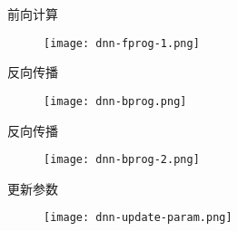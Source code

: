 \begin{frame}[fragile]{前向计算}
  \begin{figure}
    \centering
    \texttt{[image: dnn-fprog-1.png]}
  \end{figure}
\end{frame}

\begin{frame}[fragile]{反向传播}
  \begin{figure}
    \centering
    \texttt{[image: dnn-bprog.png]}
  \end{figure}
\end{frame}

\begin{frame}[fragile]{反向传播}
  \begin{figure}
    \centering
    \texttt{[image: dnn-bprog-2.png]}
  \end{figure}
\end{frame}

\begin{frame}[fragile]{更新参数}
  \begin{figure}
    \centering
    \texttt{[image: dnn-update-param.png]}
  \end{figure}
\end{frame}




